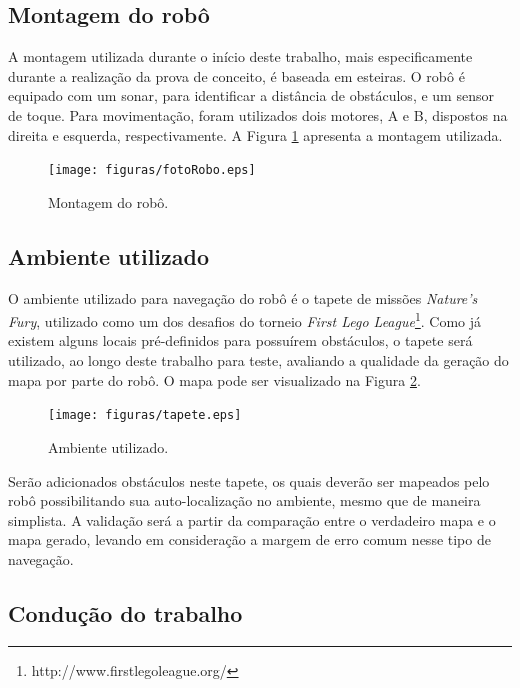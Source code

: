 	\subsection{Montagem do robô} %
	\label{sub:montagem_do_robô}
		
		A montagem utilizada durante o início deste trabalho, mais especificamente durante a realização da prova de conceito, é baseada em esteiras. O robô é equipado com um sonar, para identificar a distância de obstáculos, e um sensor de toque. Para movimentação, foram utilizados dois motores, A e B, dispostos na direita e esquerda, respectivamente. A Figura \ref{img:fotoRobo} apresenta a montagem utilizada.

		\begin{figure}[H]
			\centering
			\texttt{[image: figuras/fotoRobo.eps]}
			\caption[Montagem do robô]{Montagem do robô.}
			\label{img:fotoRobo}
		\end{figure}

	\subsection{Ambiente utilizado} %
	\label{sub:ambiente_utilizado}
		
		O ambiente utilizado para navegação do robô é o tapete de missões \textit{Nature's Fury}, utilizado como um dos desafios do torneio \textit{First Lego League}\footnote{http://www.firstlegoleague.org/}. Como já existem alguns locais pré-definidos para possuírem obstáculos, o tapete será utilizado, ao longo deste trabalho para teste, avaliando a qualidade da geração do mapa por parte do robô. O mapa pode ser visualizado na Figura \ref{img:tapete}.

		\begin{figure}[H]
			\centering
			\texttt{[image: figuras/tapete.eps]}
			\caption[Ambiente utilizado]{Ambiente utilizado.}
			\label{img:tapete}
		\end{figure}

		Serão adicionados obstáculos neste tapete, os quais deverão ser mapeados pelo robô possibilitando sua auto-localização no ambiente, mesmo que de maneira simplista. A validação será a partir da comparação entre o verdadeiro mapa e o mapa gerado, levando em consideração a margem de erro comum nesse tipo de navegação.


	\subsection{Condução do trabalho} %
	\label{sub:condução_do_trabalho}

